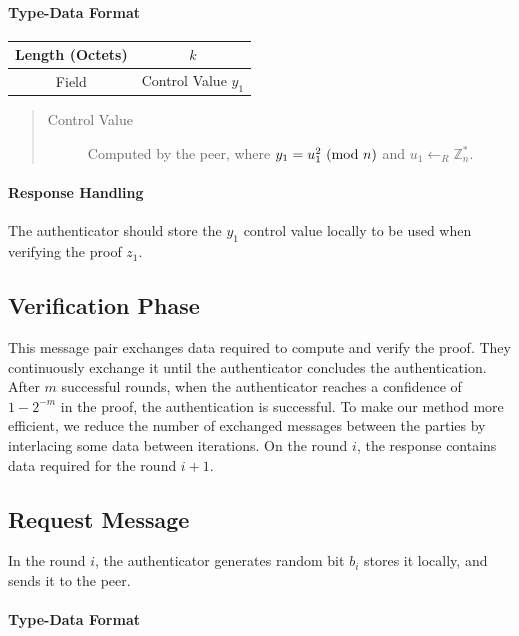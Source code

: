 \paragraph{Type-Data Format}

\begin{center}
\begin{tabular}{|c|c|}
	\hline
	Length (Octets) & $k$ \\
	\hline
	Field & Control Value $y_1$\\
	\hline
\end{tabular}
\end{center}

\bigskip
\begin{quote}
\begin{description}
	\item[Control Value] Computed by the peer, where $y_1 = u_1^2 \ (\mathrm{mod}\ n)$ and $u_1 \leftarrow_R \mathbb{Z}^*_n$.
\end{description}
\end{quote}

\paragraph{Response Handling}
The authenticator should store the $y_1$ control value locally to be used when verifying the proof $z_1$.

\subsection{Verification Phase}
This message pair exchanges data required to compute and verify the proof.
They continuously exchange it until the authenticator concludes the authentication.
After $m$ successful rounds, when the authenticator reaches a confidence of $1 - 2^{-m}$ in the proof, the authentication is successful.
To make our method more efficient, we reduce the number of exchanged messages between the parties by interlacing some data between iterations.
On the round $i$, the response contains data required for the round $i+1$.


\subsection*{Request Message}
In the round $i$, the authenticator generates random bit $b_i$ stores it locally, and sends it to the peer.
\paragraph{Type-Data Format}

